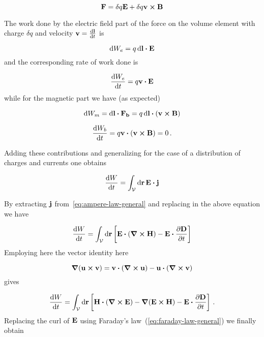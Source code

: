 \documentclass[12pt, class=report, crop=false]{standalone}
\begin{document}
\begin{equation*}
  \vb{F} = \delta q \vb{E} + \delta q \vb{v} \cp \vb{B}
\end{equation*}

\par

The work done by the electric field part of the force on the volume element with charge \( \delta q \) and velocity \( \vb{v} = \dv{\vb{l}}{t} \) is

\begin{equation*}
  \dd{W_{e}} = q \dd{\vb{l}} \vdot \vb{E}
\end{equation*}
and the corresponding rate of work done is

\begin{equation*}
  \dv{W_{e}}{t} = q \vb{v} \vdot \vb{E}
\end{equation*}
while for the magnetic part we have (as expected)

\begin{equation*}
  \dd{W_{m}} = \dd{\vb{l}} \vdot \vb{F_{b}} = q \dd{\vb{l}} \vdot ( \vb{v} \cp \vb{B})
\end{equation*}

\begin{equation*}
  \dv{W_{b}}{t} = q \vb{v} \vdot ( \vb{v} \cp \vb{B}) = 0 \,.
\end{equation*}

\par
Adding these contributions and generalizing for the case of a distribution of charges and currents one obtains

\begin{equation}
  \dv{W}{t} = \int_\mathcal{V} \dd{\vb{r}} \vb{E}\vdot\vb{j}
\end{equation}

By extracting \(\vb{j}\) from~\cref{eq:ampere-law-general} and replacing in the above equation we have

\begin{equation*}
  \dv{W}{t} = \int_\mathcal{V} \dd{\vb{r}} \left[ \vb{E}\vdot (\curl{\vb{H}}) - \vb{E}\vdot \pdv{\vb{D}}{t} \right]
\end{equation*}
Employing here the vector identity here

\begin{equation}
  \label{id:grad-of-vector-product}
  \grad{(\vb{u}\cp\vb{v})} = \vb{v}\vdot(\curl{\vb{u}})-\vb{u}\vdot(\curl{\vb{v}})
\end{equation}
gives

\begin{equation*}
  \dv{W}{t} = \int_\mathcal{V} \dd{\vb{r}} \left[ \vb{H}\vdot (\curl{\vb{E}}) - \grad{(\vb{E}\cp\vb{H})} - \vb{E}\vdot \pdv{\vb{D}}{t} \right] \,.
\end{equation*}
Replacing the curl of \( \vb{E}\) using Faraday's law~(\ref{eq:faraday-law-general}) we finally obtain
\end{document}

